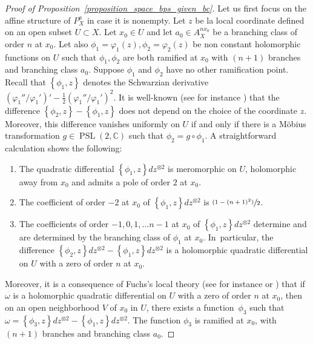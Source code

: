 \documentclass[JEP,XML,SOM,Unicode,NoEqCountersInSection,published]{cedram}
\newcommand{\psfrac}[2]{\sfrac{(#1)}{#2}}
\newcommand{\C}{\mathbb C}
\DeclareMathOperator{\PSL}{PSL}
\theoremstyle{definition}
\theoremstyle{plain}
\begin{document}
\begin{proof}[Proof of Proposition~\ref{proposition_space_bps_given_bc}]
Let us first focus on the affine structure of $P_X^a$ in case it is nonempty.
Let $z$ be la local coordinate defined on an open subset $U \subset X$.
Let $x_0 \in U$ and let $a_0 \in A_X^{nx_0}$ be a branching class of order $n$ at $x_0$.
Let also $\phi_1 = \varphi_1(z), \phi_2 = \varphi_2(z)$ be non constant holomorphic functions on $U$ such that $\phi_1, \phi_2$ are both ramified at $x_0$ with $(n+1)$ branches and branching class $a_0$.
Suppose $\phi_1$ and $\phi_2$ have no other ramification point.
Recall that $\left\{\phi_1, z\right\}$ denotes the Schwarzian derivative $\left(\varphi_1''/\varphi_1'\right)' - \frac 1 2 \left(\varphi_1''/\varphi_1'\right)^2$.
It is well-known (see for instance \cite{gunning}) that the difference $\left\{\phi_2, z\right\} - \left\{\phi_1, z\right\}$ does not depend on the choice of the coordinate $z$.
Moreover, this difference vanishes uniformly on $U$ if and only if there is a Möbius transformation $g \in \PSL(2, \C)$ such that $\phi_2 = g \circ \phi_1$.
A straightforward calculation shows the following:
\begin{enumerate}
\item
The quadratic differential $\left\{\phi_1, z\right\}dz^{\otimes 2}$ is meromorphic on $U$, holomorphic away from $x_0$ and admits a pole of order $2$ at $x_0$.
\item
The coefficient of order $-2$ at $x_0$ of $\left\{\phi_1, z\right\}dz^{\otimes 2}$ is $\psfrac{1 - (n+1)^2}2$.
\item
The coefficients of order $-1, 0, 1, \dots n-1$ at $x_0$ of $\left\{\phi_1, z\right\}dz^{\otimes 2}$ determine and are determined by the branching class of $\phi_1$ at $x_0$. In~particular, the difference $\left\{\phi_2, z\right\}dz^{\otimes 2} - \left\{\phi_1, z\right\}dz^{\otimes 2}$ is a holomorphic quadratic differential on $U$ with a zero of order $n$ at $x_0$.
\end{enumerate}

Moreover, it is a consequence of Fuchs's local theory (see for instance \cite{mandelbaum_1} or \cite[\S IX.1]{saint-gervais_en}) that if $\omega$ is a holomorphic quadratic differential on $U$ with a zero of order $n$ at $x_0$, then on an open neighborhood $V$ of $x_0$ in $U$, there exists a function~$\phi_3$ such that $\omega = \left\{\phi_3, z\right\}dz^{\otimes 2} - \left\{\phi_1, z\right\}dz^{\otimes 2}$.
The function $\phi_3$ is ramified at $x_0$, with $(n+1)$ branches and branching class $a_0$.


\end{proof}
\end{document}
